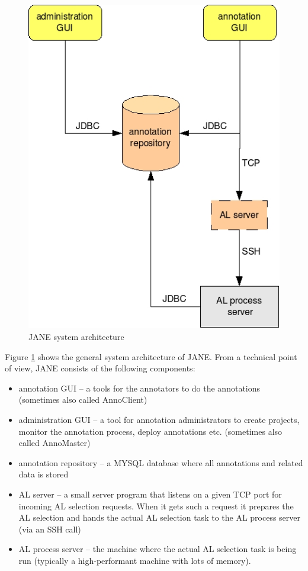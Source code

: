 \documentclass[DIV12,english,11pt,halfparskip]{scrartcl}
\begin{document}
\begin{figure}[h]
  \centering
  \includegraphics[scale=0.4]{figs/architecture.jpg}
  \caption{JANE system architecture}
  \label{fig:architecture}
\end{figure}


Figure \ref{fig:architecture} shows the general system architecture of
JANE. From a technical point of view, JANE consists of the following components:

\begin{itemize}
\item annotation GUI -- a tools for the annotators to do the
  annotations (sometimes also called AnnoClient)
\item administration GUI -- a tool for annotation administrators to
  create projects, monitor the annotation process, deploy annotations
  etc. (sometimes also called AnnoMaster)
\item annotation repository -- a MYSQL database where all annotations
  and related data is stored
\item AL server -- a small server program that listens on a given TCP
  port for incoming AL selection requests. When it gets such a request
  it prepares the AL selection and hands the actual AL selection task
  to the AL process server (via an SSH call)
\item AL process server -- the machine where the actual AL selection
  task is being run (typically a high-performant machine with lots of
  memory).
\end{itemize}
\end{document}
